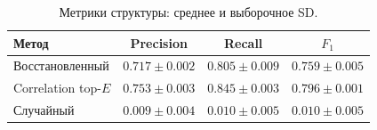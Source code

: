 \begin{table}[H]\centering
\small
\caption{Метрики структуры: среднее и выборочное SD.}
\begin{tabular}{@{}lccc@{}}\toprule
Метод & Precision & Recall & $F_1$ \\
\midrule
Восстановленный & $0.717 \pm 0.002$ & $0.805 \pm 0.009$ & $0.759 \pm 0.005$ \\
Correlation top-$E$ & $0.753 \pm 0.003$ & $0.845 \pm 0.003$ & $0.796 \pm 0.001$ \\
Случайный & $0.009 \pm 0.004$ & $0.010 \pm 0.005$ & $0.010 \pm 0.005$ \\
\bottomrule
\end{tabular}
\end{table}

